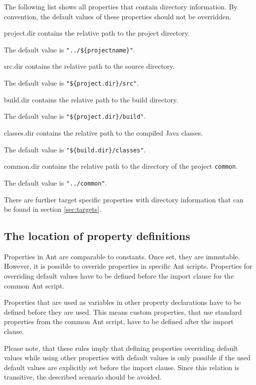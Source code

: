 \documentclass[a4paper,twoside,11pt,bibtotoc]{article}
\begin{document}
The following list shows all properties that contain directory information.
By convention, the default values of these properties should not be overridden.
\begin{description*}
	\item[project.dir] contains the relative path to the project directory.\par The default value is \texttt{"../\$\{projectname\}"}.
	\item[src.dir] contains the relative path to the source directory.\par The default value is \texttt{"\$\{project.dir\}/src"}.
	\item[build.dir] contains the relative path to the build directory.\par The default value is \texttt{"\$\{project.dir\}/build"}.
	\item[classes.dir] contains the relative path to the compiled Java classes.\par The default value is \texttt{"\$\{build.dir\}/classes"}.
	\item[common.dir] contains the relative path to the directory of the project \texttt{common}.\par The default value is \texttt{"../common"}.
\end{description*}
There are further target specific properties with directory information that can be found in section \ref{sec:targets}.

\subsection{The location of property definitions}
Properties in Ant are comparable to constants.
Once set, they are immutable.
However, it is possible to override properties in specific Ant scripts.
Properties for overriding default values have to be defined before the import clause for the common Ant script.

Properties that are used as variables in other property declarations have to be defined before they are used.
This means custom properties, that use standard properties from the common Ant script, have to be defined after the import clause.

Please note, that these rules imply that defining properties overriding default values while using other properties with default values is only possible if the used default values are explicitly set before the import clause.
Since this relation is transitive, the described scenario should be avoided.
\end{document}

